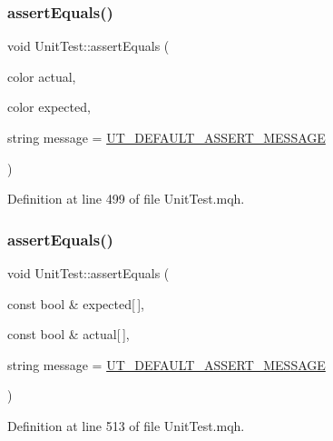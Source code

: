 \subsubsection{\texorpdfstring{assert\+Equals()}{assertEquals()}\hspace{0.1cm}{\footnotesize\ttfamily [14/28]}}
{\footnotesize\ttfamily void Unit\+Test\+::assert\+Equals (\begin{DoxyParamCaption}\item[{color}]{actual,  }\item[{color}]{expected,  }\item[{string}]{message = {\ttfamily \mbox{\hyperlink{_unit_test_8mqh_a96f5d62188d09039ebc3f443c9120e39}{U\+T\+\_\+\+D\+E\+F\+A\+U\+L\+T\+\_\+\+A\+S\+S\+E\+R\+T\+\_\+\+M\+E\+S\+S\+A\+GE}}} }\end{DoxyParamCaption})}



Definition at line 499 of file Unit\+Test.\+mqh.

\mbox{\label{class_unit_test_a93caaffb03a038b9bd37c459b537c491}} 
\subsubsection{\texorpdfstring{assert\+Equals()}{assertEquals()}\hspace{0.1cm}{\footnotesize\ttfamily [15/28]}}
{\footnotesize\ttfamily void Unit\+Test\+::assert\+Equals (\begin{DoxyParamCaption}\item[{const bool \&}]{expected\mbox{[}$\,$\mbox{]},  }\item[{const bool \&}]{actual\mbox{[}$\,$\mbox{]},  }\item[{string}]{message = {\ttfamily \mbox{\hyperlink{_unit_test_8mqh_a96f5d62188d09039ebc3f443c9120e39}{U\+T\+\_\+\+D\+E\+F\+A\+U\+L\+T\+\_\+\+A\+S\+S\+E\+R\+T\+\_\+\+M\+E\+S\+S\+A\+GE}}} }\end{DoxyParamCaption})}



Definition at line 513 of file Unit\+Test.\+mqh.

\mbox{\label{class_unit_test_ab07f01b8cc4bde52c9b1df315c01c43c}} 

